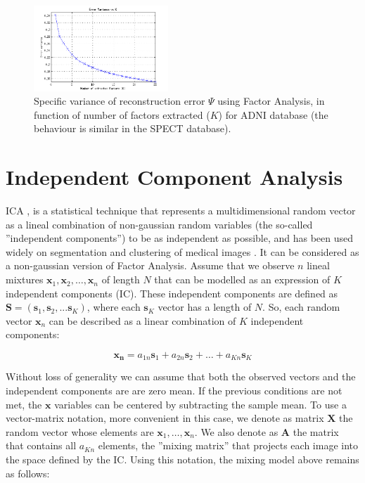 \begin{figure}[ht]
	\centering
	\includegraphics[width=0.45\textwidth]{gfx/ch5/varError-K-ADNI}
	\caption{Specific variance of reconstruction error $\Psi$ using Factor Analysis, in function of number of factors extracted ($K$) for ADNI database (the behaviour is similar in the SPECT database).}
	\label{fig:error}
\end{figure}

\section{Independent Component Analysis}
\cite{Martinez-Murcia2013255,Martinez-Murcia201458}

\acf{ICA} \cite{Hyvarinen2000}, is a statistical technique that represents a multidimensional random vector as a lineal combination of non-gaussian random variables (the so-called ''independent components'') to be as independent as possible, and has been used widely on segmentation and clustering of medical images \cite{DeMartino2007,Alvarez2009,IllanTesis,Theis2005}. It can be considered as a non-gaussian version of Factor Analysis. Assume that we observe $n$ lineal mixtures $\mathbf{x}_1, \mathbf{x}_2, \ldots, \mathbf{x}_n$ of length $N$ that can be modelled as an expression of $K$ independent components (IC). These independent components are defined as $\mathbf{S} = (\mathbf{s}_1, \mathbf{s}_2, ... \mathbf{s}_K)$, where each $\mathbf{s}_K$ vector has a length of $N$. So, each random vector $\mathbf{x}_n$ can be described as a linear combination of $K$ independent components: 

\begin{equation}
\mathbf{x_n} = a_{1n}\mathbf{s}_1 + a_{2n}\mathbf{s}_2 + \ldots + a_{Kn}\mathbf{s}_K
\end{equation}

Without loss of generality we can assume that both the observed vectors and the independent components are are zero mean. If the previous conditions are not met, the $\mathbf{x}$ variables can be centered by subtracting the sample mean. To use a vector-matrix notation, more convenient in this case, we denote as matrix $\mathbf{X}$ the random vector whose elements are $\mathbf{x}_1, \ldots, \mathbf{x}_n$. We also denote as $\mathbf{A}$ the matrix that contains all $a_{Kn}$ elements, the ''mixing matrix'' that projects each image into the space defined by the IC. Using this notation, the mixing model above remains as follows: 

